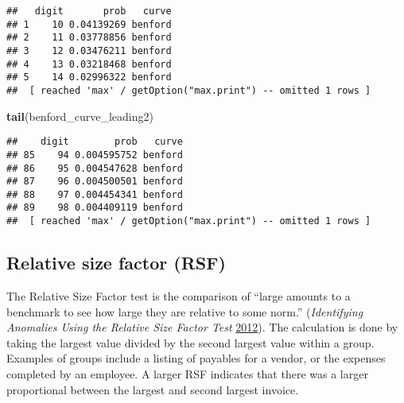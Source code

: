 \documentclass[
]{book}
\newenvironment{Shaded}{\begin{snugshade}}{\end{snugshade}}
\newcommand{\DataTypeTok}[1]{\textcolor[rgb]{0.13,0.29,0.53}{#1}}
\newcommand{\DecValTok}[1]{\textcolor[rgb]{0.00,0.00,0.81}{#1}}
\newcommand{\KeywordTok}[1]{\textcolor[rgb]{0.13,0.29,0.53}{\textbf{#1}}}
\newcommand{\NormalTok}[1]{#1}
\newcommand{\OperatorTok}[1]{\textcolor[rgb]{0.81,0.36,0.00}{\textbf{#1}}}
\newcommand{\StringTok}[1]{\textcolor[rgb]{0.31,0.60,0.02}{#1}}
\begin{document}
\begin{Shaded}
\end{Shaded}

\begin{verbatim}
##   digit       prob   curve
## 1    10 0.04139269 benford
## 2    11 0.03778856 benford
## 3    12 0.03476211 benford
## 4    13 0.03218468 benford
## 5    14 0.02996322 benford
##  [ reached 'max' / getOption("max.print") -- omitted 1 rows ]
\end{verbatim}

\begin{Shaded}
\begin{Highlighting}[]
\KeywordTok{tail}\NormalTok{(benford_curve_leading2)}
\end{Highlighting}
\end{Shaded}

\begin{verbatim}
##    digit        prob   curve
## 85    94 0.004595752 benford
## 86    95 0.004547628 benford
## 87    96 0.004500501 benford
## 88    97 0.004454341 benford
## 89    98 0.004409119 benford
##  [ reached 'max' / getOption("max.print") -- omitted 1 rows ]
\end{verbatim}

\hypertarget{relative-size-factor-rsf}{%
\subsection{Relative size factor (RSF)}\label{relative-size-factor-rsf}}

The Relative Size Factor test is the comparison of ``large amounts to a benchmark to see how large they are relative to some norm.'' (\emph{Identifying Anomalies Using the Relative Size Factor Test} \protect\hyperlink{ref-nigrini-forensicanalytics-ch11}{2012}). The calculation is done by taking the largest value divided by the second largest value within a group. Examples of groups include a listing of payables for a vendor, or the expenses completed by an employee. A larger RSF indicates that there was a larger proportional between the largest and second largest invoice.
\end{document}
